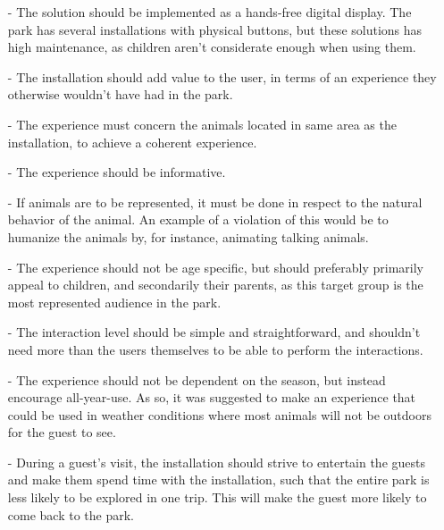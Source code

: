 \begin{itemize}
    \item[-] The solution should be implemented as a hands-free digital display. The park has several installations with physical buttons, but these solutions has high maintenance, as children aren't considerate enough when using them. 
    \item[-] The installation should add value to the user, in terms of an experience they otherwise wouldn't have had in the park. 
    \item[-] The experience must concern the animals located in same area as the installation, to achieve a coherent experience.
    \item [-] The experience should be informative.
    \item[-] If animals are to be represented, it must be done in respect to the natural behavior of the animal. An example of a violation of this would be to humanize the animals by, for instance, animating talking animals. 
    \item[-] The experience should not be age specific, but should preferably primarily appeal to children, and secondarily their parents, as this target group is the most represented audience in the park. 
    \item[-] The interaction level should be simple and straightforward, and shouldn't need more than the users themselves to be able to perform the interactions. 
    \item[-] The experience should not be dependent on the season, but instead encourage all-year-use. As so, it was suggested to make an experience that could be used in weather conditions where most animals will not be outdoors for the guest to see.
    \item[-] During a guest's visit, the installation should strive to entertain the guests and make them spend time with the installation, such that the entire park is less likely to be explored in one trip. This will make the guest more likely to come back to the park.
    
    
\end{itemize}

   
